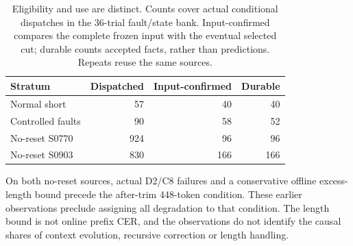 \begin{table}[t]
\centering
\caption{Eligibility and use are distinct. Counts cover actual conditional
dispatches in the 36-trial fault/state bank. Input-confirmed compares the
complete frozen input with the eventual selected cut; durable counts
accepted facts, rather than predictions. Repeats reuse the same sources.}
\label{tab:conditional_inputs}
\small\setlength{\tabcolsep}{3pt}
\begin{tabular}{@{}lrrr@{}}
\toprule
Stratum & Dispatched & Input-confirmed & Durable\\
\midrule
Normal short & 57 & 40 & 40\\
Controlled faults & 90 & 58 & 52\\
No-reset S0770 & 924 & 96 & 96\\
No-reset S0903 & 830 & 166 & 166\\
\bottomrule
\end{tabular}
\end{table}


On both no-reset sources, actual D2/C8 failures and a conservative offline
excess-length bound precede the after-trim 448-token condition.
These earlier observations preclude assigning all degradation to that
condition. The length bound is not online prefix CER, and the observations
do not identify the causal
shares of context evolution, recursive correction or length handling.

